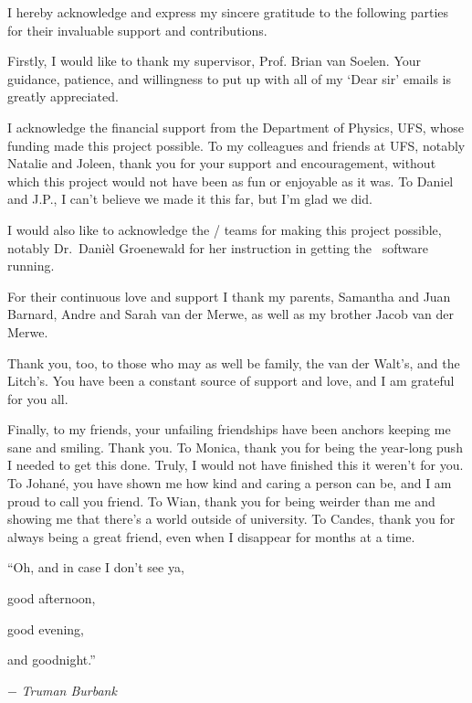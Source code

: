 \begin{acknowledgements}

    \baselineskip

    I hereby acknowledge and express my sincere gratitude to the following parties for their invaluable support and contributions.

    Firstly, I would like to thank my supervisor, Prof. Brian van Soelen.
    Your guidance, patience, and willingness to put up with all of my `Dear sir' emails is greatly appreciated.

    I acknowledge the financial support from the Department of Physics, UFS, whose funding made this project possible.
    To my colleagues and friends at UFS, notably Natalie and Joleen, thank you for your support and encouragement, without which this project would not have been as fun or enjoyable as it was.
    To Daniel and J.P., I can't believe we made it this far, but I'm glad we did.
    
    I would also like to acknowledge the / teams for making this project possible, notably Dr.~Dani\`el Groenewald for her instruction in getting the \polsalt\ software running.
    
    
    For their continuous love and support I thank my parents, Samantha and Juan Barnard, Andre and Sarah van der Merwe, as well as my brother Jacob van der Merwe.

    Thank you, too, to those who may as well be family, the van der Walt's, and the Litch's.
    You have been a constant source of support and love, and I am grateful for you all.
    
    Finally, to my friends, your unfailing friendships have been anchors keeping me sane and smiling.
    Thank you.
    To Monica, thank you for being the year-long push I needed to get this done.
    Truly, I would not have finished this it weren't for you.
    To Johan\'e, you have shown me how kind and caring a person can be, and I am proud to call you friend.
    To Wian, thank you for being weirder than me and showing me that there's a world outside of university.
    To Candes, thank you for always being a great friend, even when I disappear for months at a time.

    
    \vspace*{\fill}
    \begin{flushright}
        ``Oh, and in case I don't see ya,

        good afternoon,

        good evening,

        and goodnight.''\!\!

        \vspace{\baselineskip}

        $-$ \textit{Truman Burbank}

    \end{flushright}

\end{acknowledgements}
